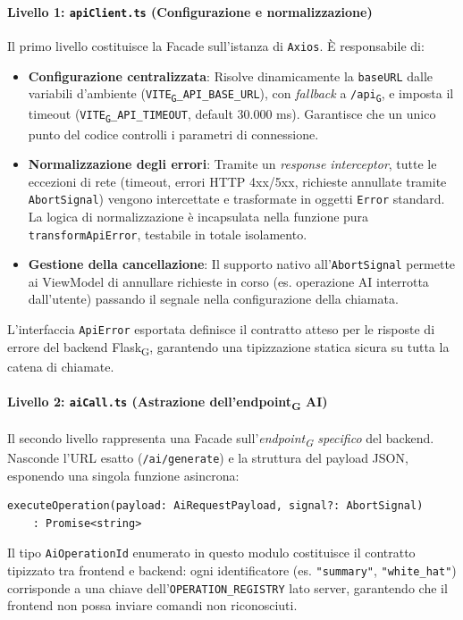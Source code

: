 \documentclass[11pt,a4paper]{article}
\newcommand{\gls}[1]{#1\textsubscript{G}}
\begin{document}
\paragraph{Livello 1: \texttt{apiClient.ts} (Configurazione e normalizzazione)}
Il primo livello costituisce la Facade sull'istanza di \texttt{Axios}. È responsabile di:
\begin{itemize}
    \item \textbf{Configurazione centralizzata}: Risolve dinamicamente la \texttt{baseURL} dalle variabili d'ambiente (\texttt{\gls{VITE}\_API\_BASE\_URL}), con \textit{fallback} a \texttt{/\gls{api}}, e imposta il timeout (\texttt{\gls{VITE}\_API\_TIMEOUT}, default 30.000 ms). Garantisce che un unico punto del codice controlli i parametri di connessione.
    \item \textbf{Normalizzazione degli errori}: Tramite un \textit{response interceptor}, tutte le eccezioni di rete (timeout, errori HTTP 4xx/5xx, richieste annullate tramite \texttt{AbortSignal}) vengono intercettate e trasformate in oggetti \texttt{Error} standard. La logica di normalizzazione è incapsulata nella funzione pura \texttt{transformApiError}, testabile in totale isolamento.
    \item \textbf{Gestione della cancellazione}: Il supporto nativo all'\texttt{AbortSignal} permette ai ViewModel di annullare richieste in corso (es. operazione AI interrotta dall'utente) passando il segnale nella configurazione della chiamata.
\end{itemize}
L'interfaccia \texttt{ApiError} esportata definisce il contratto atteso per le risposte di errore del backend \gls{Flask}, garantendo una tipizzazione statica sicura su tutta la catena di chiamate.

\paragraph{Livello 2: \texttt{aiCall.ts} (Astrazione dell'\gls{endpoint} AI)}
Il secondo livello rappresenta una Facade sull'\textit{\gls{endpoint} specifico} del backend. Nasconde l'URL esatto (\texttt{/ai/generate}) e la struttura del payload JSON, esponendo una singola funzione asincrona:

\begin{verbatim}
executeOperation(payload: AiRequestPayload, signal?: AbortSignal)
    : Promise<string>
\end{verbatim}

Il tipo \texttt{AiOperationId} enumerato in questo modulo costituisce il contratto tipizzato tra frontend e backend: ogni identificatore (es. \texttt{"summary"}, \texttt{"white\_hat"}) corrisponde a una chiave dell'\texttt{OPERATION\_REGISTRY} lato server, garantendo che il frontend non possa inviare comandi non riconosciuti.
\end{document}
